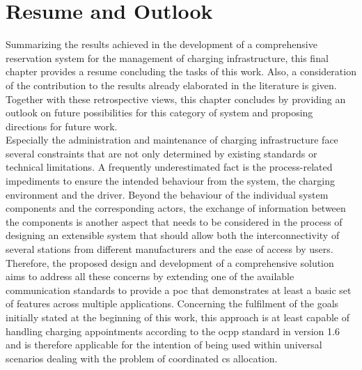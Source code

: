 

\chapter{Resume and Outlook}
\label{ch:Resume and Outlook}

Summarizing the results achieved in the development of a comprehensive reservation system for the management of charging infrastructure, this final chapter provides a resume concluding the tasks of this work. 
Also, a consideration of the contribution to the results already elaborated in the literature is given. 
Together with these retrospective views, this chapter concludes by providing an outlook on future possibilities for this category of system and proposing directions for future work. \\
\noindent Especially the administration and maintenance of charging infrastructure face several constraints that are not only determined by existing standards or technical limitations. A frequently underestimated fact is the process-related impediments to ensure the intended behaviour from the system, the charging environment and the driver.
Beyond the behaviour of the individual system components and the corresponding actors, the exchange of information between the components is another aspect that needs to be considered in the process of designing an extensible system that should allow both the interconnectivity of several stations from different manufacturers and the ease of access by users.
Therefore, the proposed design and development of a comprehensive solution aims to address all these concerns by extending one of the available communication standards to provide a \acrshort{poc} that demonstrates at least a basic set of features across multiple applications.
Concerning the fulfilment of the goals initially stated at the beginning of this work, this approach is at least capable of handling charging appointments according to the \acrshort{ocpp} standard in version 1.6 and is therefore applicable for the intention of being used within universal scenarios dealing with the problem of coordinated \acrshort{cs} allocation. 
